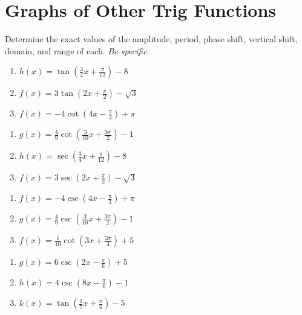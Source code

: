 \chapter{Graphs of Other Trig Functions}

Determine the exact values of the amplitude, period, phase shift, vertical shift, domain, and range of each. \emph{Be specific}.

\begin{multicols}{3}
\begin{enumerate}
	\item $h(x) = \tan\left(\frac{3}{4}x + \frac{\pi}{12}\right) - 8$
	\item $f(x)=3\tan\left(2x+\frac{\pi}{2}\right)-\sqrt{3}$
	\item $f(x) = -4\cot\left(4x-\frac{\pi}{3}\right) + \pi$
\end{enumerate}	\setcounter{Review}{\value{enumi}}
\end{multicols}
\smallskip 
\begin{multicols}{3}
\begin{enumerate}	\setcounter{enumi}{\value{Review}}
	\item $g(x) = \frac{4}{9}\cot\left(\frac{3}{10}x + \frac{3\pi}{2}\right) - 1$
	\item $h(x) = \sec\left(\frac{3}{4}x + \frac{\pi}{12}\right) - 8$
	\item $f(x)=3\sec\left(2x+\frac{\pi}{2}\right)-\sqrt{3}$
\end{enumerate}	\setcounter{Review}{\value{enumi}}
\end{multicols}
\smallskip 
\begin{multicols}{3}
\begin{enumerate}	\setcounter{enumi}{\value{Review}}
	\item $f(x) = -4\csc\left(4x-\frac{\pi}{3}\right) + \pi$
	\item $g(x) = \frac{4}{9}\csc\left(\frac{3}{10}x + \frac{3\pi}{2}\right) - 1$
	\item $f(x) = \frac{1}{10}\cot\left(3x+\frac{3\pi}{4}\right) + 5$
\end{enumerate}	\setcounter{Review}{\value{enumi}}
\end{multicols}
\smallskip
\begin{multicols}{3}
\begin{enumerate}	\setcounter{enumi}{\value{Review}}
	\item $g(x) = 6\csc\left(2x-\frac{\pi}{6}\right)+5$
	\item $h(x) = 4\csc\left(8x-\frac{\pi}{6}\right)-1$
	\item $k(x) = \tan\left(\frac{1}{7}x+\frac{\pi}{4}\right)-5$
\end{enumerate}	\setcounter{Review}{\value{enumi}}
\end{multicols}
